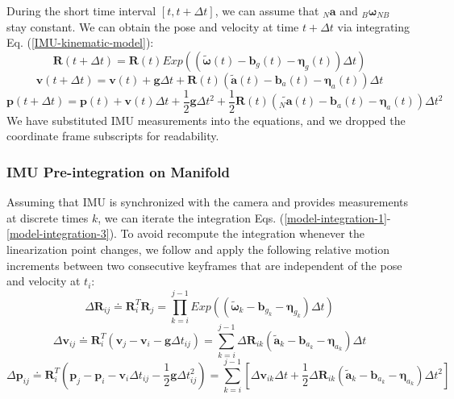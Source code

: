 \documentclass[journal,article,submit,moreauthors,pdftex]{Definitions/mdpi}
\begin{document}
During the short time interval $\left[t,t+\Delta{t}\right]$,  we can assume that ${_N}\boldsymbol{a}$ and ${_B}\boldsymbol{\omega}_{NB}$ stay constant. We can obtain the pose and velocity at time $t+\Delta{t}$ via integrating Eq. (\ref{IMU-kinematic-model}):
\begin{equation}
	\boldsymbol{R}(t+\Delta{t})  = \boldsymbol{R}(t) Exp \left((\widetilde{\boldsymbol{\omega}}(t) - \boldsymbol{b}_g(t) - \boldsymbol{\eta}_g(t)) \Delta{t} \right)
	\label{model-integration-1}
\end{equation}
\begin{equation}
	\boldsymbol{v}(t+\Delta{t}) = \boldsymbol{v}(t) + \boldsymbol{g}\Delta{t} + \boldsymbol{R}(t) \left(  \widetilde{\boldsymbol{a}}(t) - \boldsymbol{b}_a(t) - \boldsymbol{\eta}_a(t) \right) \Delta{t}
	\label{model-integration-2}
\end{equation}
\begin{equation}
	\boldsymbol{p}(t+\Delta{t}) = \boldsymbol{p}(t) + \boldsymbol{v}(t)\Delta{t} + \frac{1}{2}\boldsymbol{g}\Delta{t}^2 + \frac{1}{2} \boldsymbol{R}(t) \left(  \widetilde{{_N}\boldsymbol{a}}(t) - \boldsymbol{b}_a(t) - \boldsymbol{\eta}_a(t) \right) \Delta{t}^2
	\label{model-integration-3}
\end{equation}
We have substituted IMU measurements into the equations, and we dropped the coordinate frame subscripts for readability. 

\subsubsection{IMU Pre-integration on Manifold}
Assuming that IMU is synchronized with the camera and provides measurements at discrete times $k$, we can iterate the integration Eqs. (\ref{model-integration-1}-\ref{model-integration-3}). To avoid recompute the integration whenever the linearization point changes, we follow \cite{forsterOnManifoldPreintegrationRealTime2017} and apply the following relative motion increments between two consecutive keyframes that are independent of the pose and velocity at $t_i$:
\begin{equation}
	\Delta{\boldsymbol{R}_{ij}} \doteq \boldsymbol{R}_i^T \boldsymbol{R}_j = \prod_{k=i}^{j-1} Exp \left((\widetilde{\boldsymbol{\omega}}_k - \boldsymbol{b}_{g_k} - \boldsymbol{\eta}_{g_k}) \Delta{t} \right)
\end{equation}
\begin{equation}
	\Delta{\boldsymbol{v}_{ij}} \doteq \boldsymbol{R}_i^T(\boldsymbol{v}_j-\boldsymbol{v}_i-\boldsymbol{g}\Delta{t_{ij}}) = \sum_{k=i}^{j-1}\Delta{\boldsymbol{R}_{ik}} \left( \widetilde{\boldsymbol{a}}_k - \boldsymbol{b}_{a_k} - \boldsymbol{\eta}_{a_k} \right) \Delta{t}
\end{equation}
\begin{equation}
	\Delta{\boldsymbol{p}_{ij}} \doteq \boldsymbol{R}_i^T(\boldsymbol{p}_j-\boldsymbol{p}_i-\boldsymbol{v}_i\Delta{t_{ij}}-\frac{1}{2}\boldsymbol{g}\Delta{t_{ij}^2}) = \sum_{k=i}^{j-1} \left[ \Delta{\boldsymbol{v}_{ik}}\Delta{t} + \frac{1}{2}\Delta{\boldsymbol{R}_{ik}}(\widetilde{\boldsymbol{a}}_k - \boldsymbol{b}_{a_k} - \boldsymbol{\eta}_{a_k})\Delta{t}^2 \right] 
\end{equation}
\end{document}
